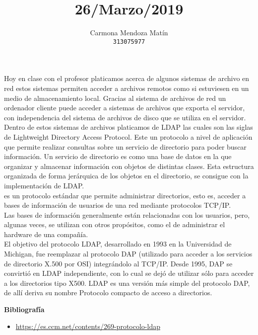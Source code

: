 \documentclass[11pt, a4paper]{report}
\begin{document}
\title{26/Marzo/2019}
\author{
  Carmona Mendoza Mat\'in\\
  \texttt{313075977}
}
\date{}
\maketitle

Hoy en clase con el profesor platicamos acerca de algunos sistemas de archivo
en red estos sistemas permiten acceder a archivos remotos como si estuviesen en
un medio de almacenamiento local. Gracias al sistema de archivos de red un
ordenador cliente puede acceder a sistemas de archivos que exporta el servidor,
con independencia del sistema de archivos de disco que se utiliza en el
servidor. Dentro de estos sistemas de archivos platicamos de LDAP las cuales
son las siglas de Lightweight Directory Access Protocol. Este un protocolo a
nivel de aplicación que permite realizar consultas sobre un servicio de
directorio para poder buscar información. Un servicio de directorio es como una
base de datos en la que organizar y almacenar información con objetos de
distintas clases. Esta estructura organizada de forma jerárquica de los objetos
en el directorio, se consigue con la implementación de LDAP. \\

es un protocolo estándar que permite administrar directorios, esto es, acceder
a bases de información de usuarios de una red mediante protocolos TCP/IP. \\

Las bases de información generalmente están relacionadas con los usuarios,
pero, algunas veces, se utilizan con otros propósitos, como el de administrar
el hardware de una compañía. \\

El objetivo del protocolo LDAP, desarrollado en 1993 en la Universidad de
Michigan, fue reemplazar al protocolo DAP (utilizado para acceder a los
servicios de directorio X.500 por OSI) integrándolo al TCP/IP. Desde 1995, DAP
se convirtió en LDAP independiente, con lo cual se dejó de utilizar sólo para
acceder a los directorios tipo X500. LDAP es una versión más simple del
protocolo DAP, de allí deriva su nombre Protocolo compacto de acceso a
directorios. 

\newpage

\textbf{Bibliografía} \\

\begin{itemize}

\item \url{https://es.ccm.net/contents/269-protocolo-ldap}


\end{itemize}
\end{document}
